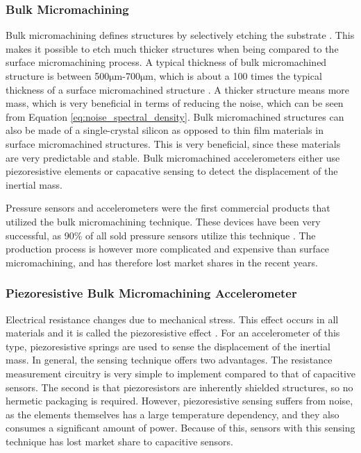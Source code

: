 \subsubsection{Bulk Micromachining}

Bulk micromachining defines structures by selectively etching the substrate \cite[p.~7]{kaajakari09}. This makes it possible to etch much thicker structures when being compared to the surface micromachining process. A typical thickness of bulk micromachined structure is between 500$\si{\micro\meter}$-700$\si{\micro\meter}$, which is about a 100 times the typical thickness of a surface micromachined structure \cite[p.~7]{kaajakari09}. A thicker structure means more mass, which is very beneficial in terms of reducing the noise, which can be seen from Equation \ref{eq:noise_spectral_density}. Bulk micromachined structures can also be made of a single-crystal silicon as opposed to thin film materials in surface micromachined structures. This is very beneficial, since these materials are very predictable and stable. Bulk micromachined accelerometers either use piezoresistive elements or capacative sensing to detect the displacement of the inertial mass.

Pressure sensors and accelerometers were the first commercial products that utilized the bulk micromachining technique. These devices have been very successful, as 90\% of all sold pressure sensors utilize this technique \cite[p.~7]{kaajakari09}. The production process is however more complicated and expensive than surface micromachining, and has therefore lost market shares in the recent years.

\subsubsection{Piezoresistive Bulk Micromachining Accelerometer}

Electrical resistance changes due to mechanical stress. This effect occurs in all materials and it is called the piezoresistive effect \cite[p.~73]{kaajakari09}. For an accelerometer of this type, piezoresistive springs are used to sense the displacement of the inertial mass. In general, the sensing technique offers two advantages. The resistance measurement circuitry is very simple to implement compared to that of capacitive sensors. The second is that piezoresistors are inherently shielded structures, so no hermetic packaging is required. However, piezoresistive sensing suffers from noise, as the elements themselves has a large temperature dependency, and they also consumes a significant amount of power. Because of this, sensors with this sensing technique has lost market share to capacitive sensors.

